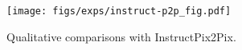 \begin{figure}[htb]
  \centering
  \texttt{[image: figs/exps/instruct-p2p\_fig.pdf]}
  \caption{Qualitative comparisons with InstructPix2Pix\cite{brooks2022instructpix2pix}.}
  \label{fig:instruct-p2p}
\end{figure}